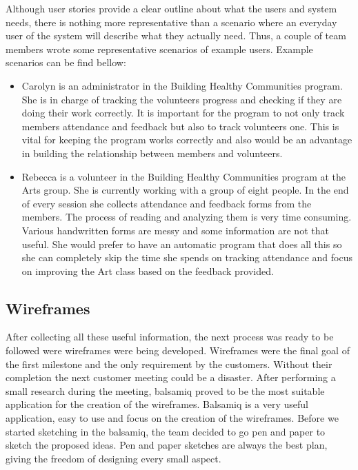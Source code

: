 \documentclass{l3proj}
\begin{document}
Although user stories provide a clear outline about what the users and system needs, there is nothing more representative than a scenario where an everyday user of the system will describe what they actually need. Thus, a couple of team members wrote some representative scenarios of example users.
Example scenarios can be find bellow:
\begin{itemize}
\item Carolyn is an administrator in the Building Healthy Communities program. She is in charge of tracking the volunteers progress and checking if they are doing their work correctly. It is important for the program to not only track members attendance and feedback but also to track volunteers one. This is vital for keeping the program works correctly and also would be an advantage in building the relationship between members and volunteers.

\item Rebecca is a volunteer in the Building Healthy Communities program at the Arts group. She is currently working with a group of eight people. In the end of every session she collects attendance and feedback forms from the members. The process of reading and analyzing them is very time consuming. Various handwritten forms are messy and some information are not that useful. She would prefer to have an automatic program that does all this so she can completely skip the time she spends on tracking attendance and focus on improving the Art class based on the feedback provided.

\end{itemize}

\subsection{Wireframes}
\label{wireframes}

After collecting all these useful information, the next process was ready to be followed were wireframes were being developed. Wireframes were the final goal of the first milestone and the only requirement by the customers. Without their completion the next customer meeting could be a disaster. After performing a small research during the meeting, balsamiq proved to be the most suitable application for the creation of the wireframes. Balsamiq is a very useful application, easy to use and focus on the creation of the wireframes. Before we started sketching in the balsamiq, the team decided to go pen and paper to sketch the proposed ideas. Pen and paper sketches are always the best plan, giving the freedom of designing every small aspect.
\end{document}
